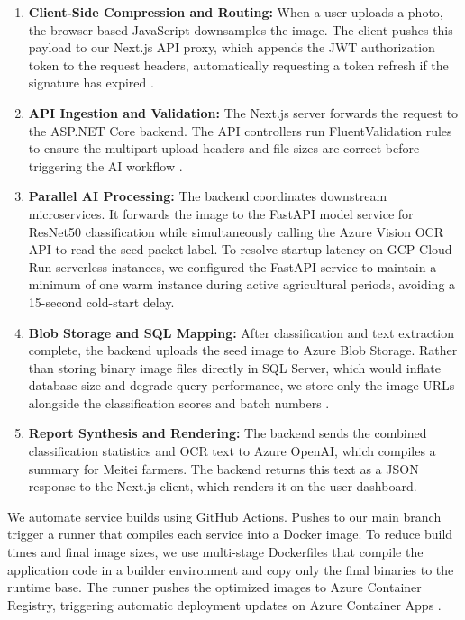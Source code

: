 \begin{enumerate}
    \item \textbf{Client-Side Compression and Routing:} When a user uploads a photo, the browser-based JavaScript downsamples the image. The client pushes this payload to our Next.js API proxy, which appends the JWT authorization token to the request headers, automatically requesting a token refresh if the signature has expired \cite{axios2024, jones2015jwt}.
    
    \item \textbf{API Ingestion and Validation:} The Next.js server forwards the request to the ASP.NET Core backend. The API controllers run FluentValidation rules to ensure the multipart upload headers and file sizes are correct before triggering the AI workflow \cite{freeman2020pro}.
    
    \item \textbf{Parallel AI Processing:} The backend coordinates downstream microservices. It forwards the image to the FastAPI model service for ResNet50 classification while simultaneously calling the Azure Vision OCR API to read the seed packet label. To resolve startup latency on GCP Cloud Run serverless instances, we configured the FastAPI service to maintain a minimum of one warm instance during active agricultural periods, avoiding a 15-second cold-start delay.
    
    \item \textbf{Blob Storage and SQL Mapping:} After classification and text extraction complete, the backend uploads the seed image to Azure Blob Storage. Rather than storing binary image files directly in SQL Server, which would inflate database size and degrade query performance, we store only the image URLs alongside the classification scores and batch numbers \cite{copard2020azure}.
    
    \item \textbf{Report Synthesis and Rendering:} The backend sends the combined classification statistics and OCR text to Azure OpenAI, which compiles a summary for Meitei farmers. The backend returns this text as a JSON response to the Next.js client, which renders it on the user dashboard.
\end{enumerate}

We automate service builds using GitHub Actions. Pushes to our main branch trigger a runner that compiles each service into a Docker image. To reduce build times and final image sizes, we use multi-stage Dockerfiles that compile the application code in a builder environment and copy only the final binaries to the runtime base. The runner pushes the optimized images to Azure Container Registry, triggering automatic deployment updates on Azure Container Apps \cite{merkel2014docker}.


